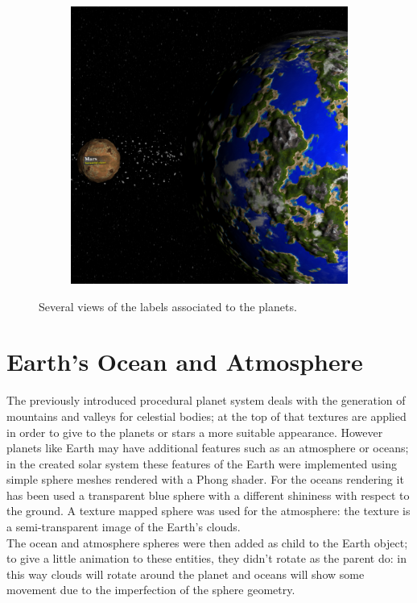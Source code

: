 \documentclass[paper=a4, fontsize=11pt]{scrartcl} %
\numberwithin{equation}{section} %
\numberwithin{figure}{section} %
\numberwithin{table}{section} %
\theoremstyle{definition}
\begin{document}
\begin{figure}
\begin{subfigure}{.32\textwidth}
	\end{subfigure}
	\begin{subfigure}{.32\textwidth}
		\centering
		\includegraphics[width=1.0\linewidth]{images/labels3.png}
	\end{subfigure}
	\caption{Several views of the labels associated to the planets.}
	\label{fig:labels}
\end{figure}


\section{Earth's Ocean and Atmosphere}

The previously introduced procedural planet system deals with the generation of mountains and valleys for celestial bodies; at the top of that textures are applied in order to give to the planets or stars a more suitable appearance. However planets like Earth may have additional features such as an atmosphere or oceans; in the created solar system these features of the Earth were implemented using simple sphere meshes rendered with a Phong shader. For the oceans rendering it has been used a transparent blue sphere with a different shininess with respect to the ground. A texture mapped sphere was used for the atmosphere: the texture is a semi-transparent image of the Earth's clouds.\\
The ocean and atmosphere spheres were then added as child to the Earth object; to give a little animation to these entities, they didn't rotate as the parent do: in this way clouds will rotate around the planet and oceans will show some movement due to the imperfection of the sphere geometry.
\end{document}
